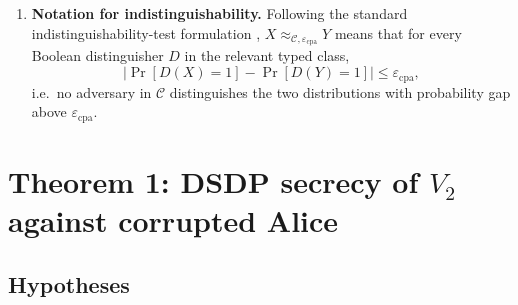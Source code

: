 \documentclass[11pt]{article}
\newcommand{\epscpa}{\varepsilon_{\mathrm{cpa}}}
\newcommand{\C}{\mathcal{C}}
\begin{document}
\begin{enumerate}
\item \textbf{Notation for indistinguishability.} Following the standard indistinguishability-test formulation \cite[Sec.~3.2]{goldreich-uniform}, $X \approx_{\C, \epscpa} Y$ means that for every Boolean distinguisher $D$ in the relevant typed class,
\[
\left|\Pr[D(X) = 1] - \Pr[D(Y) = 1]\right| \leq \epscpa,
\]
i.e.\ no adversary in $\C$ distinguishes the two distributions with probability gap above $\epscpa$.
\end{enumerate}

\section*{Theorem 1: DSDP secrecy of $V_2$ against corrupted Alice}

\subsection*{Hypotheses}
\end{document}

